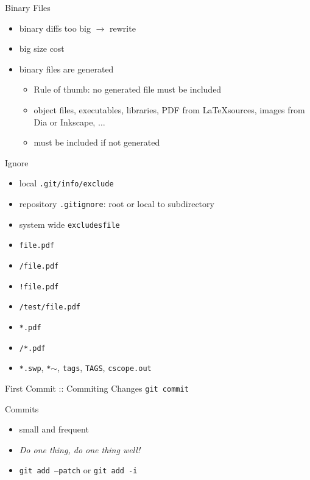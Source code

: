 \documentclass{beamer}
\begin{document}
\begin{frame}{Binary Files}
  \begin{itemize}
    \item binary diffs too big $\rightarrow$ rewrite
    \item big size cost
    \item binary files are generated
      \begin{itemize}
        \item Rule of thumb: no generated file must be included
        \item object files, executables, libraries, PDF from \LaTeX sources,
        images from Dia or Inkscape, $\ldots$
        \item must be included if not generated
      \end{itemize}
  \end{itemize}
\end{frame}

\begin{frame}{Ignore}
  \begin{itemize}
    \item local \texttt{.git/info/exclude}
    \item repository \texttt{.gitignore}: root or local to subdirectory
    \item system wide \texttt{excludesfile}
  \end{itemize}
  \pause
  \begin{itemize}
    \item \texttt{file.pdf}
    \item \texttt{/file.pdf}
    \item \texttt{!file.pdf}
    \item \texttt{/test/file.pdf}
    \item \texttt{*.pdf}
    \item \texttt{/*.pdf}
    \item \texttt{*.swp}, \texttt{*$\sim$}, \texttt{tags}, \texttt{TAGS},
      \texttt{cscope.out}
  \end{itemize}
\end{frame}

\begin{frame}{First Commit :: Commiting Changes}
  \texttt{git commit}
  \begin{center}
  \end{center}
\end{frame}

\begin{frame}{Commits}
  \begin{itemize}
    \item small and frequent
    \item \textit{Do one thing, do one thing well!}
    \item \texttt{git add --patch} or \texttt{git add -i}
  \end{itemize}
\end{frame}
\end{document}
